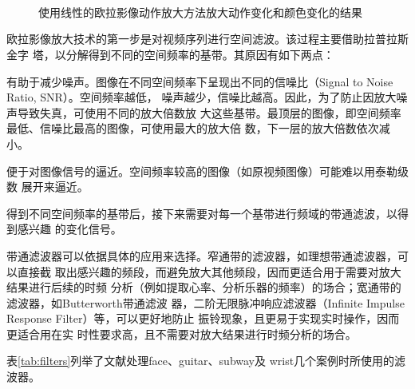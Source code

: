 \begin{figure}[htbp]
  \centering
    \\
    \\
    \\
  \caption{使用线性的欧拉影像动作放大方法放大动作变化和颜色变化的结果}
  \label{fig:color-motion}
\end{figure}


欧拉影像放大技术的第一步是对视频序列进行空间滤波。该过程主要借助拉普拉斯金字
塔，以分解得到不同的空间频率的基带。其原因有如下两点：

\begin{compactenum}
\item 有助于减少噪声。图像在不同空间频率下呈现出不同的信噪比（Signal to Noise
  Ratio, SNR）。空间频率越低，
  噪声越少，信噪比越高。因此，为了防止因放大噪声导致失真，可使用不同的放大倍数放
  大这些基带。最顶层的图像，即空间频率最低、信噪比最高的图像，可使用最大的放大倍
  数，下一层的放大倍数依次减小。
\item 便于对图像信号的逼近。空间频率较高的图像（如原视频图像）可能难以用泰勒级数
  展开来逼近。
\end{compactenum}


得到不同空间频率的基带后，接下来需要对每一个基带进行频域的带通滤波，以得到感兴趣
的变化信号。

带通滤波器可以依据具体的应用来选择。窄通带的滤波器，如理想带通滤波器，可以直接截
取出感兴趣的频段，而避免放大其他频段，因而更适合用于需要对放大结果进行后续的时频
分析（例如提取心率、分析乐器的频率）的场合；宽通带的滤波器，如Butterworth带通滤波
器，二阶无限脉冲响应滤波器（Infinite Impulse Response Filter）等，可以更好地防止
振铃现象\cite{Gonzalez:2006:DIP:1076432}，且更易于实现实时操作，因而更适合用在实
时性要求高，且不需要对放大结果进行时频分析的场合。

表\ref{tab:filters}列举了文献\cite{wu2012eulerian}处理face、guitar、subway及
wrist几个案例时所使用的滤波器。

